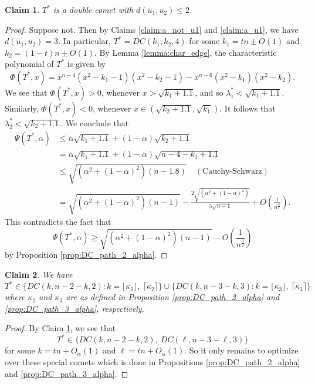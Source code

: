 \documentclass[11pt]{article}
\theoremstyle{plain}
\newtheorem{claim}{Claim}[section]
\numberwithin{equation}{section}
\begin{document}
\begin{claim}\label{claim:double_comet_distance_two}
 $T^*$ is a double comet with $d(u_1, u_2)\le 2$. 
\end{claim}

\begin{proof}
    Suppose not. Then by Claims \ref{claim:a_not_u1} and \ref{claim:a_u1}, we have $d(u_1, u_2)= 3$. In particular, $T^* = DC(k_1, k_2, 4)$ for some $k_1 = tn \pm O(1) $ and $k_2 = (1-t)n\pm O(1)$. By Lemma \ref{lemma:char_edge}, the characteristic polynomial of $T^*$ is given by 
     \[\Phi(T^*, x) = x^{n-4}\left(x^2 - k_1-1\right)\left(x^2 - k_2-1\right) - x^{n-6}\left(x^2-k_1\right)\left(x^2-k_2\right).\]
     We see that $\Phi(T^*, x)>0$, whenever $x>\sqrt{k_1+1.1}$, and so $\lambda_1^*<\sqrt{k_1+1.1}$. Similarly, $\Phi(T^*, x)<0$, whenever $x\in \left(\sqrt{k_2+1.1}, \sqrt{k_1}\right)$. It follows that $\lambda_2^* < \sqrt{k_2+1.1}$. We conclude that 
     \begin{align*}
        \Psi(T^*, \alpha)  & \le \alpha\sqrt{k_1+1.1} + (1-\alpha)\sqrt{k_2+1.1}\\
        & = \alpha\sqrt{k_1+1.1} + (1-\alpha)\sqrt{n-4-k_1+1.1}\\
        & \le \sqrt{(\alpha^2+(1-\alpha)^2)(n-1.8)}\quad (\text{Cauchy-Schwarz})\\
        & = \sqrt{(\alpha^2+(1-\alpha)^2)(n-1)} - \frac{2\sqrt{(\alpha^2+(1-\alpha)^2)}}{5\sqrt{n-1}} + O\left(\frac{1}{n^{\frac{3}{2}}}\right).
     \end{align*}
    This contradicts the fact that 
    \[  \Psi(T^*, \alpha)\ge \sqrt{(\alpha^2+(1-\alpha)^2)(n-1)} - O\left(\frac{1}{n^{\frac{3}{2}}}\right)\]
    by Proposition \ref{prop:DC_path_2_alpha}. 
\end{proof}

\begin{claim}
    We have 
    \[ T^*\in \{DC(k, n-2-k, 2): k = \lfloor\kappa_2\rfloor, \ \lceil \kappa_2\rceil \}\cup \{DC(k, n-3-k, 3): k = \lfloor\kappa_3\rfloor, \ \lceil \kappa_3\rceil \}\]
    where $\kappa_2$ and $\kappa_3$ are as defined in Proposition \ref{prop:DC_path_2_alpha} and \ref{prop:DC_path_3_alpha}, respectively. 
\end{claim}

\begin{proof}
By Claim \ref{claim:double_comet_distance_two}, we see that 
\[T^* \in \{ DC(k,n-2-k,2), \ DC(\ell, n-3-\ell, 3) \}\]
for some $ k = tn + O_\alpha(1)$ and $\ell = tn + O_\alpha(1)$. So it only remains to optimize over these special comets which is done in Propositions \ref{prop:DC_path_2_alpha} and \ref{prop:DC_path_3_alpha}.
\end{proof}
\end{document}
